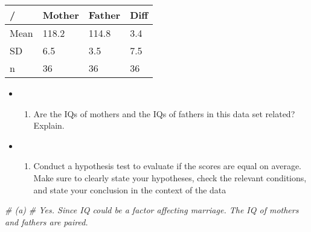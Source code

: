 \documentclass[]{book}
\newenvironment{Shaded}{\begin{snugshade}}{\end{snugshade}}
\newcommand{\CommentTok}[1]{\textcolor[rgb]{0.56,0.35,0.01}{\textit{#1}}}
\providecommand{\tightlist}{%
  \setlength{\itemsep}{0pt}\setlength{\parskip}{0pt}}
\begin{document}
\begin{longtable}[]{@{}llll@{}}
\toprule
/ & Mother & Father & Diff\tabularnewline
\midrule
\endhead
Mean & 118.2 & 114.8 & 3.4\tabularnewline
SD & 6.5 & 3.5 & 7.5\tabularnewline
n & 36 & 36 & 36\tabularnewline
\bottomrule
\end{longtable}

\begin{itemize}
\item
  \begin{enumerate}
  \def\labelenumi{(\alph{enumi})}
  \tightlist
  \item
    Are the IQs of mothers and the IQs of fathers in this data set related? Explain.
  \end{enumerate}
\item
  \begin{enumerate}
  \def\labelenumi{(\alph{enumi})}
  \setcounter{enumi}{1}
  \tightlist
  \item
    Conduct a hypothesis test to evaluate if the scores are equal on average. Make sure to clearly state your hypotheses, check the relevant conditions, and state your conclusion in the context of the data
  \end{enumerate}
\end{itemize}

\begin{Shaded}
\begin{Highlighting}[]
\CommentTok{# (a)}
\CommentTok{# Yes. Since IQ could be a factor affecting marriage. The IQ of mothers and fathers are paired.}
\end{Highlighting}
\end{Shaded}

\begin{Shaded}
\end{Shaded}
\end{document}
